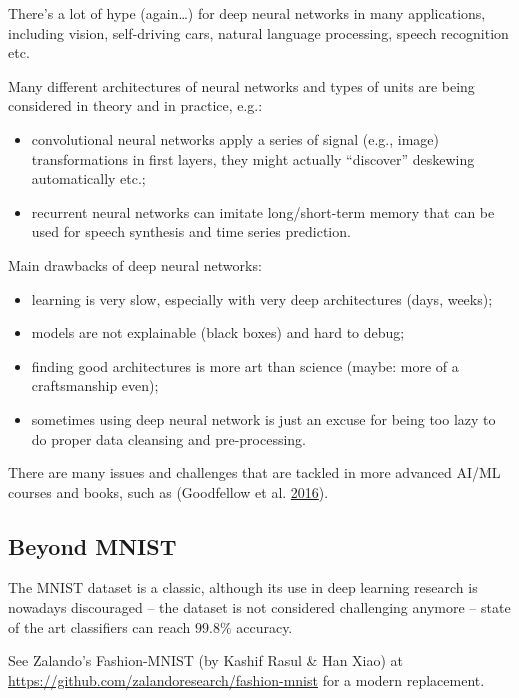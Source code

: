 \documentclass[10pt,b5paper,krantz1]{krantz}
\providecommand{\tightlist}{%
  \setlength{\itemsep}{0pt}\setlength{\parskip}{0pt}}
\begin{document}
There's a lot of hype (again\ldots{}) for deep neural networks in many applications,
including vision, self-driving cars, natural language processing,
speech recognition etc.

Many different architectures of neural networks and types of units
are being considered in theory and in practice, e.g.:

\begin{itemize}
\tightlist
\item
  convolutional neural networks apply a series of signal (e.g., image)
  transformations in first layers, they might actually ``discover''
  deskewing automatically etc.;
\item
  recurrent neural networks can imitate long/short-term memory
  that can be used for speech synthesis and time series prediction.
\end{itemize}

Main drawbacks of deep neural networks:

\begin{itemize}
\tightlist
\item
  learning is very slow, especially with very deep architectures (days, weeks);
\item
  models are not explainable (black boxes) and hard to debug;
\item
  finding good architectures is more art than science
  (maybe: more of a craftsmanship even);
\item
  sometimes using deep neural network is just an excuse for being too lazy
  to do proper data cleansing and pre-processing.
\end{itemize}

There are many issues and challenges that are tackled in more advanced
AI/ML courses and books, such as (Goodfellow et al. \protect\hyperlink{ref-deeplearn}{2016}).

\hypertarget{beyond-mnist}{%
\subsection{Beyond MNIST}\label{beyond-mnist}}

The MNIST dataset is a classic, although its use in deep learning
research is nowadays discouraged
-- the dataset is not considered challenging anymore -- state of the art classifiers
can reach \(99.8\%\) accuracy.

See Zalando's Fashion-MNIST (by Kashif Rasul \& Han Xiao) at
\url{https://github.com/zalandoresearch/fashion-mnist} for a modern replacement.
\end{document}
